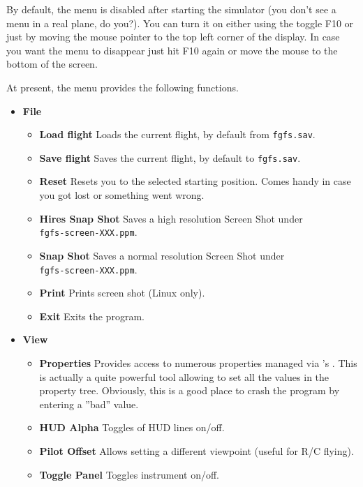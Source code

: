 By default, the menu is disabled after starting the simulator (you don't see a menu in a real plane, do you?). You can turn it on either using the toggle F10 or just by moving the mouse pointer to the top left corner of the display. In case you want the menu to disappear just hit F10 again or move the mouse to the bottom of the screen.

At present, the menu provides the following functions.

\begin{itemize}
 \item \textbf{File}
 \begin{itemize}
 \item \textbf{Load flight} Loads the current flight, by default from \texttt{fgfs.sav}.
  \item \textbf{Save flight} Saves the current flight, by default to \texttt{fgfs.sav}.
 \item \textbf{Reset} Resets you to the selected starting position. Comes handy in case you got lost or something went wrong.
\item \textbf{Hires Snap Shot} Saves a high resolution Screen Shot under\\ \texttt{fgfs-screen-XXX.ppm}.
  \item \textbf{Snap Shot} Saves a normal resolution Screen Shot under\\ \texttt{fgfs-screen-XXX.ppm}.
  \item \textbf{Print} Prints screen shot (Linux only).
  \item \textbf{Exit} Exits the program.
 \end{itemize}

 \item \textbf{View}
 \begin{itemize}
  \item \textbf{Properties} Provides access to numerous properties managed via \FlightGear{}'s . This is actually a quite powerful tool allowing to set all the values in the property tree. Obviously, this is a good place to crash the program by entering a ''bad'' value.
 \item \textbf{HUD Alpha} Toggles  of HUD lines on/off.
 \item \textbf{Pilot Offset} Allows setting a different viewpoint (useful for R/C flying).
 \item \textbf{Toggle Panel} Toggles instrument  on/off.
 \end{itemize}
 

\end{itemize}
